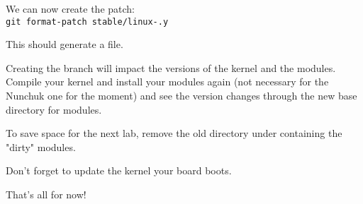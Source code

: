 We can now create the patch:\\
\texttt{git format-patch stable/linux-\workingkernel.y}

This should generate a 
file.

Creating the branch will impact the versions of the kernel and the modules.
Compile your kernel and install your modules again (not necessary for the
Nunchuk one for the moment) and see the version changes through the
new base directory for modules.

To save space for the next lab, remove the old directory under
 containing the "dirty" modules.

Don't forget to update the kernel your board boots.

That's all for now!
